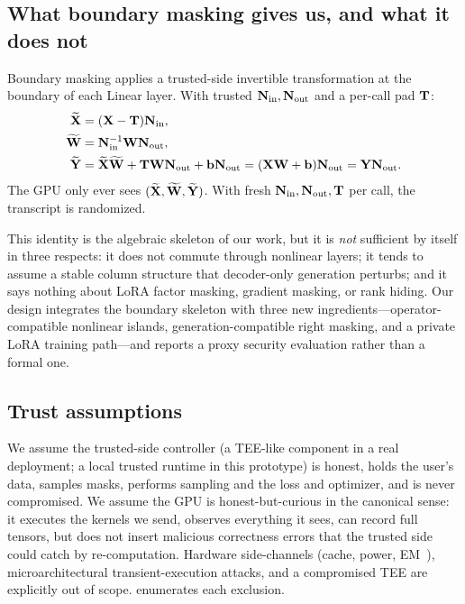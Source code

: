 \subsection{What boundary masking gives us, and what it does not}
Boundary masking applies a trusted-side invertible transformation at the boundary of each Linear layer. With trusted $\mathbf{N}_{\mathrm{in}}, \mathbf{N}_{\mathrm{out}}$ and a per-call pad $\mathbf{T}$:
\begin{align}
\widetilde{\mathbf{X}} &= (\mathbf{X} - \mathbf{T})\mathbf{N}_{\mathrm{in}}, \\
\widetilde{\mathbf{W}} &= \mathbf{N}_{\mathrm{in}}^{-1} \mathbf{W} \mathbf{N}_{\mathrm{out}}, \\
\widetilde{\mathbf{Y}} &= \widetilde{\mathbf{X}}\widetilde{\mathbf{W}} + \mathbf{T}\mathbf{W}\mathbf{N}_{\mathrm{out}} + \mathbf{b}\mathbf{N}_{\mathrm{out}} = (\mathbf{X}\mathbf{W} + \mathbf{b})\mathbf{N}_{\mathrm{out}} = \mathbf{Y}\mathbf{N}_{\mathrm{out}}.
\end{align}
The GPU only ever sees $(\widetilde{\mathbf{X}}, \widetilde{\mathbf{W}}, \widetilde{\mathbf{Y}})$. With fresh $\mathbf{N}_{\mathrm{in}}, \mathbf{N}_{\mathrm{out}}, \mathbf{T}$ per call, the transcript is randomized.

This identity is the algebraic skeleton of our work, but it is \emph{not} sufficient by itself in three respects: it does not commute through nonlinear layers; it tends to assume a stable column structure that decoder-only generation perturbs; and it says nothing about LoRA factor masking, gradient masking, or rank hiding. Our design integrates the boundary skeleton with three new ingredients---operator-compatible nonlinear islands, generation-compatible right masking, and a private LoRA training path---and reports a proxy security evaluation rather than a formal one.

\subsection{Trust assumptions}
We assume the trusted-side controller (a TEE-like component in a real deployment; a local trusted runtime in this prototype) is honest, holds the user's data, samples masks, performs sampling and the loss and optimizer, and is never compromised. We assume the GPU is honest-but-curious in the canonical sense: it executes the kernels we send, observes everything it sees, can record full tensors, but does not insert malicious correctness errors that the trusted side could catch by re-computation. Hardware side-channels (cache, power, EM~\cite{kocher2019spectre, vanbulck2018foreshadow}), microarchitectural transient-execution attacks, and a compromised TEE are explicitly out of scope.  enumerates each exclusion.
